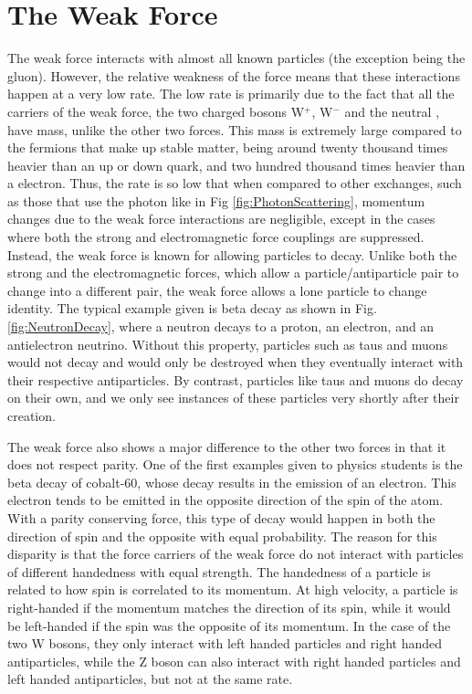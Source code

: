     
    
\section{The Weak Force}
	The weak force interacts with almost all known particles (the exception being the gluon). However, the relative weakness of the force means that these interactions happen at a very low rate. The low rate is primarily due to the fact that all the carriers of the weak force, the two charged bosons W$^+$, W$^-$ and the neutral \Z, have mass, unlike the other two forces. This mass is extremely large compared to the fermions that make up stable matter, being around twenty thousand times heavier than an up or down quark, and two hundred thousand times heavier than a electron. Thus, the rate is so low that when compared to other exchanges, such as those that use the photon like in Fig \ref{fig:PhotonScattering}, momentum changes due to the weak force interactions are negligible, except in the cases where both the strong and electromagnetic force couplings are suppressed. Instead, the weak force is known for allowing particles to decay. Unlike both the strong and the electromagnetic forces, which allow a particle/antiparticle pair to change into a different pair, the weak force allows a lone particle to change identity. The typical example given is beta decay as shown in Fig. \ref{fig:NeutronDecay}, where a neutron decays to a proton, an electron, and an antielectron neutrino. Without this property, particles such as taus and muons would not decay and would only be destroyed when they eventually interact with their respective antiparticles. By contrast, particles like taus and muons do decay on their own, and we only see instances of these particles very shortly after their creation.\par
    The weak force also shows a major difference to the other two forces in that it does not respect parity. One of the first examples given to physics students is the beta decay of cobalt-60, whose decay results in the emission of an electron. This electron tends to be emitted in the opposite direction of the spin of the atom. With a parity conserving force, this type of decay would happen in both the direction of spin and the opposite with equal probability. The reason for this disparity is that the force carriers of the weak force do not interact with particles of different handedness with equal strength. The handedness of a particle is related to how spin is correlated to its momentum. At high velocity, a particle is right-handed if the momentum matches the direction of its spin, while it would be left-handed if the spin was the opposite of its momentum. In the case of the two W bosons, they only interact with left handed particles and right handed antiparticles, while the Z boson can also interact with right handed particles and left handed antiparticles, but not at the same rate. \par
    
